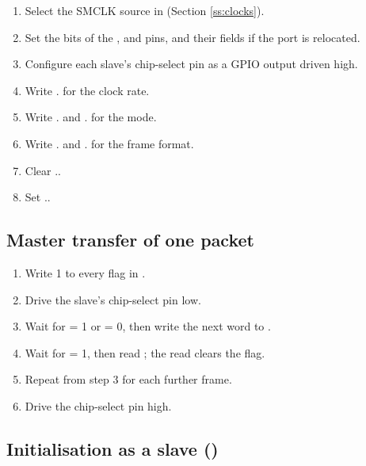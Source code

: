 \begin{enumerate}
	\item Select the SMCLK source in  (Section \ref{ss:clocks}).
	\item Set the  bits of the ,  and  pins, and their  fields if the port is relocated.
	\item Configure each slave's chip-select pin as a GPIO output driven high.
	\item Write . for the clock rate.
	\item Write . and . for the mode.
	\item Write . and . for the frame format.
	\item Clear ..
	\item Set ..
\end{enumerate}

\subsection{Master transfer of one packet}

\begin{enumerate}
	\item Write 1 to every flag in .
	\item Drive the slave's chip-select pin low.
	\item Wait for  = 1 or  = 0, then write the next word to .
	\item Wait for  = 1, then read ; the read clears the flag.
	\item Repeat from step 3 for each further frame.
	\item Drive the chip-select pin high.
\end{enumerate}

\subsection{Initialisation as a slave ()}

